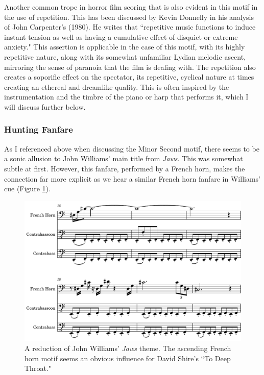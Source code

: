 Another common trope in horror film scoring that is also evident in this motif in the use of repetition.
This has been discussed by Kevin Donnelly in his analysis of John Carpenter's  (1980).
He writes that ``repetitive music functions to induce instant tension as well as having a cumulative effect of disquiet or extreme anxiety."\autocites[][161]{donnelly_hearing_2010}
This assertion is applicable in the case of this motif, with its highly repetitive nature, along with its somewhat unfamiliar Lydian melodic ascent, mirroring the sense of paranoia that the film is dealing with.
The repetition also creates a soporific effect on the spectator, its repetitive, cyclical nature at times creating an ethereal and dreamlike quality.
This is often inspired by the instrumentation and the timbre of the piano or harp that performs it, which I will discuss further below.


\subsubsection{Hunting Fanfare}

As I referenced above when discussing the Minor Second motif, there seems to be a sonic allusion to John Williams' main title from \textit{Jaws}.
This was somewhat subtle at first.
However, this fanfare, performed by a French horn, makes the connection far more explicit as we hear a similar French horn fanfare in Williams' cue (Figure \ref{fig:president-jaws-fanfare}).

\begin{figure}
    \centering
    \includegraphics[width=1\linewidth]{img/president-jaws-fanfare.pdf}
    \caption{A reduction of John Williams' \textit{Jaws} theme. The ascending French horn motif seems an obvious influence for David Shire's ``To Deep Throat."}
    \label{fig:president-jaws-fanfare}
\end{figure}

